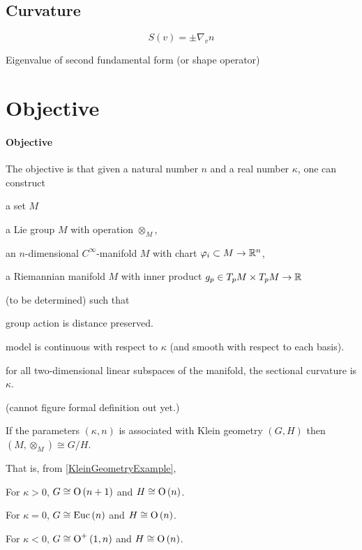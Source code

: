 \documentclass[stu, babel, american, biblatex, a4paper, leqno, draftall]{apa7}
\begin{document}
\subsection{Curvature}

\begin{example}\label{ShapeOperator}
    $$S\left(v\right)=\pm\nabla_v n$$
\end{example}
\begin{example}\label{PrincipalCurvature}
    Eigenvalue of second fundamental form (or shape operator)
\end{example}

\section{Objective}
\paragraph{Objective}\label{Objective}
The objective is that
given a natural number $n$ and a real number $\kappa$,
one can construct
\begin{APAenumerate}
    \item a set $M$
    \item a Lie group $M$ with operation $\otimes_M$,
    \item an $n$-dimensional $C^\infty$-manifold $M$ with chart $\varphi_i \subset M\to\mathbb{R}^n$,
    \item a Riemannian manifold $M$ with inner product $g_p\in T_pM\times T_pM\to\mathbb{R}$
\end{APAenumerate}
(to be determined)
such that
\begin{APAitemize}
    \item group action is distance preserved. 
    \item model is continuous with respect to $\kappa$ (and smooth with respect to each basis).
    \item for all two-dimensional linear subspaces of the manifold, the sectional curvature is $\kappa$.
\end{APAitemize}
(cannot figure formal definition out yet.)

\begin{conjecture}\label{GeometricGroupStructure}
    If the parameters $\left(\kappa,n\right)$ is associated with Klein geometry $\left(G,H\right)$
    then $\left(M,\otimes_M\right)\cong G/H$.

    That is, from \cref{KleinGeometryExample},
    \begin{APAitemize}
        \item For $\kappa>0$, $G\cong\operatorname{O}\left(n+1\right)$ and $H\cong\operatorname{O}\left(n\right)$.
        \item For $\kappa=0$, $G\cong\operatorname{Euc}\left(n\right)$ and $H\cong\operatorname{O}\left(n\right)$.
        \item For $\kappa<0$, $G\cong\operatorname{O}^{+}\left(1,n\right)$ and $H\cong\operatorname{O}\left(n\right)$.
    \end{APAitemize}
\end{conjecture}
\end{document}

